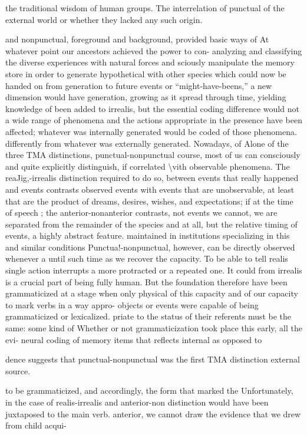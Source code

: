 the traditional wisdom of human groups. The interrelation of punctual of the external world or whether they lacked any such origin.

and nonpunctual, foreground and background, provided basic ways of At whatever point our ancestors achieved the power to con- analyzing and classifying the diverse experiences with natural forces and sciously manipulate the memory store in order to generate hypothetical with other species which could now be handed on from generation to future events or ``might-have-beens,'' a new dimension would have generation, growing as it spread through time, yielding knowledge of been added to irrealis, but the essential coding difference would not a wide range of phenomena and the actions appropriate in the presence have been affected; whatever was internally generated would be coded of those phenomena. differently from whatever was externally generated. Nowadays, of Alone of the three TMA distinctions, punctual-nonpunctual course, most of us can consciously and quite explicitly distinguish, if correlated {\textbackslash}vith observable phenomena. The reaJig,-irrealis distinction required to do so, between events that really happened and events contrasts observed events with events that are unobservable, at least that are the product of dreams, desires, wishes, and expectations; if at the time of speech ; the anterior-nonanterior contrasts, not events we cannot, we are separated from the remainder of the species and at all, but the relative timing of events, a high!y abstract feature. maintained in institutions specializing in this and similar conditions Punctua!-nonpunctual, however, can be directly observed whenever a until such time as we recover the capacity. To be able to tell realis single action interrupts a more protracted or a repeated one. It could from irrealis is a crucial part of being fully human. But the foundation therefore have been grammaticized at a stage when only physical of this capacity and of our capacity to mark verbs in a way appro- objects or events were capable of being grammaticized or lexicalized. priate to the status of their referents must be the same: some kind of Whether or not grammaticization took place this early, all the evi- neural coding of memory items that reflects internal as opposed to

dence suggests that punctual-nonpunctual was the first TMA distinction external source.

to be grammaticized, and accordingly, the form that marked the Unfortunately, in the case of realis-irrealis and anterior-non distinction would have been juxtaposed to the main verb. anterior, we cannot draw the evidence that we drew from child acqui{}-

